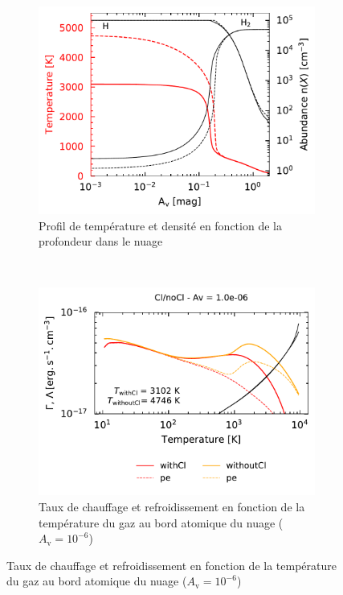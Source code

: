 \begin{figure}[!h]
    \centering
    \begin{subfigure}[t]{0.45\textwidth} %
        \centering \includegraphics[trim = {0 0 0 0cm},clip,width=1\textwidth]{figure/Cl/profilT.pdf}
        \caption{Profil de température et densité en fonction de la profondeur dans le nuage}\label{fig:ClT}
    \end{subfigure}
    ~ 
    \begin{subfigure}[t]{0.45\textwidth}
        \centering \includegraphics[trim = {0 0 0 1cm},clip,width=1\textwidth]{figure/Cl/GCcomp_h_1p0em06.pdf}
        \caption{Taux de chauffage et refroidissement en fonction de la température du gaz au bord atomique du nuage ($A_{\mathrm{v}} = 10^{-6}$)}\label{fig:ClHC}

\end{subfigure}
\end{figure}
